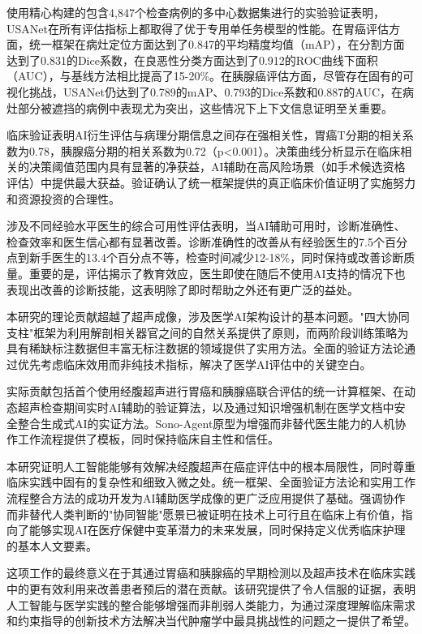 使用精心构建的包含4,847个检查病例的多中心数据集进行的实验验证表明，USANet在所有评估指标上都取得了优于专用单任务模型的性能。在胃癌评估方面，统一框架在病灶定位方面达到了0.847的平均精度均值（mAP），在分割方面达到了0.831的Dice系数，在良恶性分类方面达到了0.912的ROC曲线下面积（AUC），与基线方法相比提高了15-20\%。在胰腺癌评估方面，尽管存在固有的可视化挑战，USANet仍达到了0.789的mAP、0.793的Dice系数和0.887的AUC，在病灶部分被遮挡的病例中表现尤为突出，这些情况下上下文信息证明至关重要。

临床验证表明AI衍生评估与病理分期信息之间存在强相关性，胃癌T分期的相关系数为0.78，胰腺癌分期的相关系数为0.72（p<0.001）。决策曲线分析显示在临床相关的决策阈值范围内具有显著的净获益，AI辅助在高风险场景（如手术候选资格评估）中提供最大获益。验证确认了统一框架提供的真正临床价值证明了实施努力和资源投资的合理性。

涉及不同经验水平医生的综合可用性评估表明，当AI辅助可用时，诊断准确性、检查效率和医生信心都有显著改善。诊断准确性的改善从有经验医生的7.5个百分点到新手医生的13.4个百分点不等，检查时间减少12-18\%，同时保持或改善诊断质量。重要的是，评估揭示了教育效应，医生即使在随后不使用AI支持的情况下也表现出改善的诊断技能，这表明除了即时帮助之外还有更广泛的益处。

本研究的理论贡献超越了超声成像，涉及医学AI架构设计的基本问题。"四大协同支柱"框架为利用解剖相关器官之间的自然关系提供了原则，而两阶段训练策略为具有稀缺标注数据但丰富无标注数据的领域提供了实用方法。全面的验证方法论通过优先考虑临床效用而非纯技术指标，解决了医学AI评估中的关键空白。

实际贡献包括首个使用经腹超声进行胃癌和胰腺癌联合评估的统一计算框架、在动态超声检查期间实时AI辅助的验证算法，以及通过知识增强机制在医学文档中安全整合生成式AI的实证方法。Sono-Agent原型为增强而非替代医生能力的人机协作工作流程提供了模板，同时保持临床自主性和信任。

本研究证明人工智能能够有效解决经腹超声在癌症评估中的根本局限性，同时尊重临床实践中固有的复杂性和细致入微之处。统一框架、全面验证方法论和实用工作流程整合方法的成功开发为AI辅助医学成像的更广泛应用提供了基础。强调协作而非替代人类判断的"协同智能"愿景已被证明在技术上可行且在临床上有价值，指向了能够实现AI在医疗保健中变革潜力的未来发展，同时保持定义优秀临床护理的基本人文要素。

这项工作的最终意义在于其通过胃癌和胰腺癌的早期检测以及超声技术在临床实践中的更有效利用来改善患者预后的潜在贡献。该研究提供了令人信服的证据，表明人工智能与医学实践的整合能够增强而非削弱人类能力，为通过深度理解临床需求和约束指导的创新技术方法解决当代肿瘤学中最具挑战性的问题之一提供了希望。